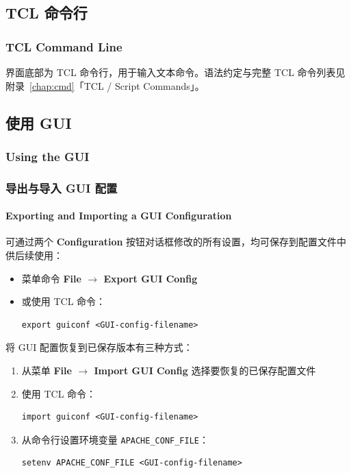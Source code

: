 \subsection{TCL 命令行}
\subsubsection*{TCL Command Line}

界面底部为 TCL 命令行，用于输入文本命令。语法约定与完整 TCL 命令列表见附录~\ref{chap:cmd}「TCL / Script Commands」。

\subsection{使用 GUI}
\subsubsection*{Using the GUI}

\subsubsection{导出与导入 GUI 配置}
\paragraph*{Exporting and Importing a GUI Configuration}

可通过两个 \textbf{Configuration} 按钮对话框修改的所有设置，均可保存到配置文件中供后续使用：
\begin{itemize}
  \item 菜单命令 \textbf{File $\rightarrow$ Export GUI Config}
  \item 或使用 TCL 命令：
\begin{lstlisting}
export guiconf <GUI-config-filename>
\end{lstlisting}
\end{itemize}

将 GUI 配置恢复到已保存版本有三种方式：
\begin{enumerate}
  \item 从菜单 \textbf{File $\rightarrow$ Import GUI Config} 选择要恢复的已保存配置文件
  \item 使用 TCL 命令：
\begin{lstlisting}
import guiconf <GUI-config-filename>
\end{lstlisting}
  \item 从命令行设置环境变量 \texttt{APACHE\_CONF\_FILE}：
\begin{lstlisting}
setenv APACHE_CONF_FILE <GUI-config-filename>
\end{lstlisting}
\end{enumerate}

